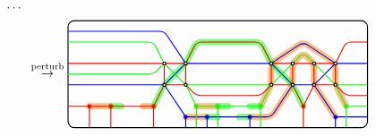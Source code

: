 \begin{align*}
\begin{tikzpicture}[baseline=-.5ex, scale=0.6]
\draw (1, -2) node {$\cdots$};
\end{tikzpicture}\\
&\stackrel{\rm perturb}{\rightarrow}
\begin{tikzpicture}[baseline=-.5ex, scale=0.6]
\draw[rounded corners=5,thick] (-7, -2.5) rectangle (7, 2.5);
\clip[rounded corners=5] (-7, -2.5) rectangle (7, 2.5);
\draw[color=cyclecolor1, line cap=round, line width=5, opacity=0.5, rounded corners]
(-6,-1.5) -- (-5,-1.5) (-3.5,-1.5)--(-3,-1.5) (-1,-1.5)--(0,-1.5) (2,-1.5)--(2.5,-0.5)--(2.5,0.5)--(4,1.5)--(5.5,0.5) -- (5.5,-0.5) -- (6,-1.5) 
(-1.5,-2)--(-0.5,-2) (1.5,-2)--(2.5,-2)--(3.5,-0.5)--(3.5,0.5)--(4,1)--(4.5,0.5)--(4.5,-0.5)--(5.5,-2);
\draw[color=cyclecolor2, line cap=round, line width=5, opacity=0.5, rounded corners]
(-5,-1.5)--(-4.5,-1.5) (0,-1.5)--(0.5,-1.5) (1.5,-1.5)--(2,-1.5) (-0.5,-2)--(0,-2) (1,-2)--(1.5,-2)
(-3,-1.5)--(-2.5,-0.5)--(-1.5,0.5)--(-1,1.5)--(2,1.5)--(2.5,0.5)--(3.5,-0.5)--(4,-1.5);
\draw[thick, blue, rounded corners] 
(-7,2) -- (-2.5,2) -- (-1.5,0.5) (2.5, 0.5) -- (4,1.5) -- (5.5,0.5) (1.5,-2)--(2.5,-2)--(3.5,-0.5);
\draw[thick, blue] 
(-7,-0.5) -- (-2.5,-0.5) -- (-1.5,-2) --(1.5,-2)  (3.5,-0.5) -- (4.5,-0.5) -- (5.5,-2) -- (7,-2)
(-2.5,-0.5) -- (-1.5,0.5) -- (2.5,0.5) -- (3.5,-0.5) (4.5,-0.5) -- (5.5,0.5) -- (7,0.5)
(-1.5,-2) -- (-1.5,-2.5) (-0.5,-2) -- (-0.5,-2.5) (1.5,-2) -- (1.5,-2.5) (5.5,-2) -- (5.5,-2.5) ;
\draw[thick, red, rounded corners] 
(-1.5,0.5) -- (-1,1.5) -- (2,1.5) -- (2.5,0.5) (5.5,0.5)-- (6,1.5) -- (7,1.5)
(-1.5,-0.5) -- (-1,-1) -- (2,-1) -- (2.5,-0.5) (5.5,-0.5)-- (6,-1) -- (7,-1);
\draw[thick, red] 
(-7,0.5) -- (-1.5,0.5) (2.5,0.5) -- (5.5,0.5) (-7,-1.5) -- (-3,-1.5) -- (-2.5,-0.5) -- (-1.5,-0.5)
(2.5,-0.5) -- (3.5,-0.5) -- (4,-1.5) -- (4.5,-0.5) -- (5.5,-0.5)
(-6,-1.5) -- (-6,-2.5) (-5,-1.5) -- (-5,-2.5)(-3,-1.5) -- (-3,-2.5)
(-2.5,0.5)--(-2.5,-0.5) (-1.5,0.5)-- (-1.5,-0.5)
(2.5,0.5)--(2.5,-0.5) (3.5,0.5)-- (3.5,-0.5)
(4.5,0.5)--(4.5,-0.5) (5.5,0.5)-- (5.5,-0.5) (4,-1.5) -- (4,-2.5);
\draw[thick, green, rounded corners] 
(-7,1.5) -- (-3,1.5) -- (-2.5,0.5) (-7,0)-- (-3,0) -- (-2.5,0.5) (3.5,0.5)--(4,1)--(4.5,0.5);
\draw[thick, green]
(-2.5,0.5)--(-1.5,-0.5) -- (2.5,-0.5) -- (3.5,0.5) (4.5,0.5)--(5.5,-0.5)--(7,-0.5)
(-1.5,-0.5) -- (-1,-1.5) -- (2,-1.5) -- (2.5,-0.5) (5.5,-0.5)--(6,-1.5) --(7,-1.5)
(-1,-1.5)--(-1,-2.5) (0,-1.5)--(0,-2.5) (2,-1.5)--(2,-2.5) (6,-1.5)--(6,-2.5);
\draw[thick, blue, fill] 
(-1.5,-2) circle (2pt) (-0.5,-2) circle (2pt) (1.5,-2) circle (2pt) (5.5,-2) circle (2pt) ;
\draw[thick, red, fill] 
(-6,-1.5) circle (2pt) (-5,-1.5) circle (2pt) (-3,-1.5) circle (2pt) (4,-1.5) circle (2pt) ;
\draw[thick, green, fill] 
(-1,-1.5) circle (2pt) (0,-1.5) circle (2pt) (2,-1.5) circle (2pt) (6,-1.5) circle (2pt) ;
\draw[fill=white, thick] 
(-2.5,0.5) circle (2pt) (-1.5,0.5) circle (2pt) (2.5,0.5) circle (2pt) (3.5,0.5) circle (2pt)
(4.5,0.5) circle (2pt) (5.5,0.5) circle (2pt)
(-2.5,-0.5) circle (2pt) (-1.5,-0.5) circle (2pt) (2.5,-0.5) circle (2pt) (3.5,-0.5) circle (2pt)
(4.5,-0.5) circle (2pt) (5.5,-0.5) circle (2pt);
\end{tikzpicture}
\end{align*}

